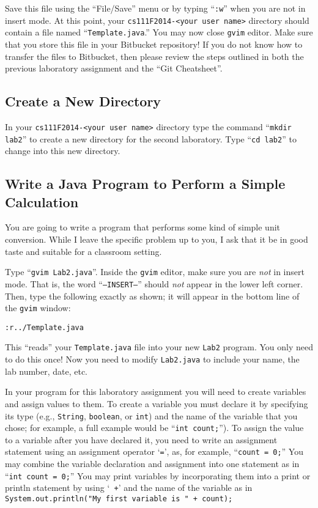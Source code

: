 \vspace*{-.1in}

\noindent Save this file using the ``File/Save'' menu or by typing ``{\tt :w}'' when you are not in insert mode. At this
point, your {\tt cs111F2014-<your user name>} directory should contain a file named ``{\tt Template.java}.'' You may now
close {\tt gvim} editor. Make sure that you store this file in your Bitbucket repository! If you do not know how to
transfer the files to Bitbucket, then please review the steps outlined in both the previous laboratory assignment and the ``Git
Cheatsheet''.

\vspace*{-.1in}
\subsection*{Create a New Directory}

In your {\tt cs111F2014-<your user name>} directory type the command ``{\tt mkdir lab2}'' to create a new directory for
the second laboratory.
\noindent Type ``{\tt cd lab2}'' to change into this new directory.  

\vspace*{-.1in}
\subsection*{Write a Java Program to Perform a Simple Calculation}

You are going to write a program that performs some kind of simple unit conversion. While I leave the specific problem
up to you, I ask that it be in good taste and suitable for a classroom setting.

 Type ``{\tt gvim Lab2.java}''. Inside the {\tt gvim} editor, make sure you are {\em
not} in insert mode. That is, the word ``{\tt --INSERT--}'' should {\em not} appear in the lower left corner. Then, type
the following exactly as shown; it will appear in the bottom line of the {\tt gvim} window: 

\begin{center} \verb$:r../Template.java$ \end{center} 

This ``reads'' your {\tt Template.java} file into your new {\tt Lab2} program.  You only need to do this once!  Now you
need to modify {\tt Lab2.java} to include your name, the lab number, date, etc.

In your program for this laboratory assignment you will need to create variables and assign values to them. To create a
variable you must declare it by specifying its type (e.g., {\tt String}, {\tt boolean}, or {\tt int}) and the name of
the variable that you chose; for example, a full example would be ``{\tt int count;}'').  To assign the value to a
variable after you have declared it, you need to write an assignment statement using an assignment operator `{\tt =}',
as, for example, ``{\tt count = 0;}'' You may combine the variable declaration and assignment into one statement as in
``{\tt int count = 0;}'' You may print variables by incorporating them into a print or println statement by using `{\tt
+}' and the name of the variable as in {\tt System.out.println("My first variable is " + count);} 

